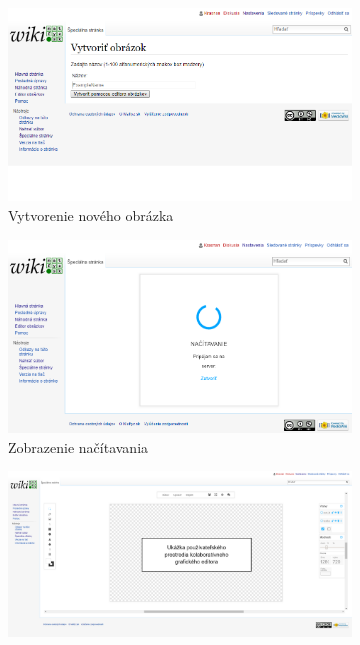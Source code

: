 \begin{figure}
	\centering
	\begin{subfigure}[t]{0.48\linewidth}	
		\centerline{\includegraphics[width=1\textwidth]{images/results/base-new}}
		\caption{Vytvorenie nového obrázka}
	\end{subfigure}
	\quad
	\begin{subfigure}[t]{0.48\linewidth}	
		\centerline{\includegraphics[width=1\textwidth]{images/results/base-loading}}
		\caption{Zobrazenie načítavania}
	\end{subfigure}
	\quad
	\begin{subfigure}[t]{1\linewidth}	
		\centerline{\includegraphics[width=1\textwidth]{images/results/base-editor}}

\end{subfigure}
\end{figure}
